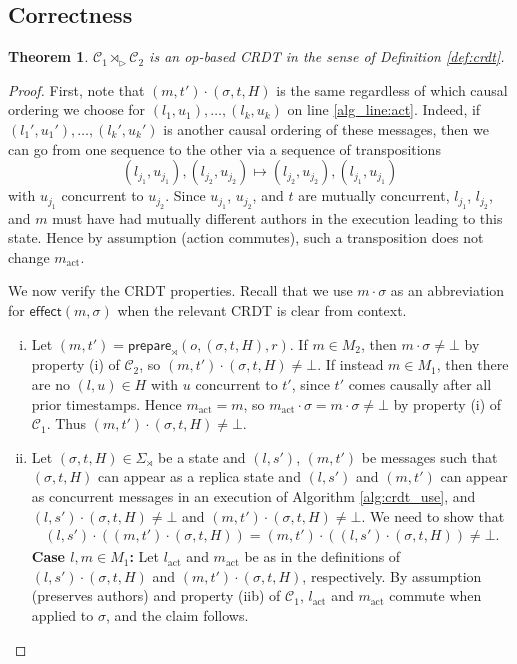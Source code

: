 \documentclass[acmsmall,nonacm]{acmart}
\newcommand{\mc}[1]{\ensuremath{\mathcal{#1}}}
\newcommand{\msf}[1]{\ensuremath{\mathsf{#1}}}
\newcommand{\act}{\triangleright}
\theoremstyle{plain}
\newtheorem{mythm}{Theorem}[section]
\theoremstyle{definition}
\begin{document}
\subsection{Correctness}
\begin{mythm}
\label{thm:correctness}
$\mc{C}_1 \rtimes_\act \mc{C}_2$ is an op-based CRDT in the sense of Definition \ref{def:crdt}.
\end{mythm}
\begin{proof}
First, note that $(m, t') \cdot (\sigma, t, H)$ is the same regardless of which causal ordering we choose for $(l_1, u_1), \dots, (l_k, u_k)$ on line \ref{alg_line:act}.  %
Indeed, if $(l_1', u_1'), \dots, (l_k', u_k')$ is another causal ordering of these messages, then we can go from one sequence to the other via a sequence of transpositions $$(l_{j_1}, u_{j_1}), (l_{j_2}, u_{j_2}) \mapsto (l_{j_2}, u_{j_2}), (l_{j_1}, u_{j_1})$$ with $u_{j_1}$ concurrent to $u_{j_2}$.  Since $u_{j_1}$, $u_{j_2}$, and $t$ are mutually concurrent, $l_{j_1}$, $l_{j_2}$, and $m$ must have had mutually different authors in the execution leading to this state.  Hence by assumption (action commutes), such a transposition does not change $m_{\text{act}}$.

We now verify the CRDT properties.  Recall that we use $m \cdot \sigma$ as an abbreviation for $\msf{effect}(m, \sigma)$ when the relevant CRDT is clear from context.
\begin{enumerate}[(i)]
  \item Let $(m, t') = \msf{prepare}_\rtimes(o, (\sigma, t, H), r)$.  If $m \in M_2$, then $m \cdot \sigma \neq \bot$ by property (i) of $\mc{C}_2$, so $(m, t') \cdot (\sigma, t, H) \neq \bot$.  If instead $m \in M_1$, then there are no $(l, u) \in H$ with $u$ concurrent to $t'$, since $t'$ comes causally after all prior timestamps.  Hence $m_{\text{act}} = m$, so $m_{\text{act}} \cdot \sigma = m \cdot \sigma \neq \bot$ by property (i) of $\mc{C}_1$.  Thus $(m, t') \cdot (\sigma, t, H) \neq \bot$.
  \item Let $(\sigma, t, H) \in \Sigma_\rtimes$ be a state and $(l, s')$, $(m, t')$ be messages such that $(\sigma, t, H)$ can appear as a replica state and $(l, s')$ and $(m, t')$ can appear as concurrent messages in an execution of Algorithm \ref{alg:crdt_use}, and $(l, s') \cdot (\sigma, t, H) \neq \bot$ and $(m, t') \cdot (\sigma, t, H) \neq \bot$.  We need to show that
  \begin{align*}
  (l, s') \cdot ((m, t') \cdot (\sigma, t, H)) = (m, t') \cdot ((l, s') \cdot (\sigma, t, H)) \neq \bot.
  \end{align*}
\textbf{Case $l, m \in M_1$:} Let $l_{\text{act}}$ and $m_{\text{act}}$ be as in the definitions of $(l, s') \cdot (\sigma, t, H)$ and $(m, t') \cdot (\sigma, t, H)$, respectively.  By assumption (preserves authors) and property (iib) of $\mc{C}_1$, $l_{\text{act}}$ and $m_{\text{act}}$ commute when applied to $\sigma$, and the claim follows.
  

\end{enumerate}
\end{proof}
\end{document}
